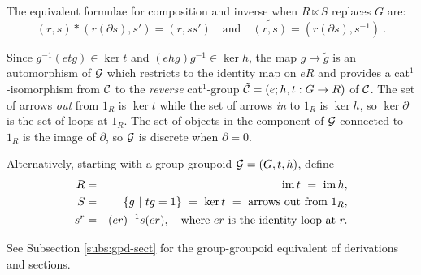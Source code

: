\medskip\noindent
The equivalent formulae for composition and inverse 
when  $R \ltimes S$  replaces $G$ are:
$$
(r, s) * (r (\partial s), s') = (r, ss')
\quad \mbox{and} \quad  
\widetilde{(r,s)} = (r(\partial s), s^{-1})~.
$$

Since  $g^{-1}(etg) \in \ker t$  and  $(ehg)g^{-1} \in \ker h$,
the map  $g \mapsto \tilde{g}$  is an automorphism of  $\mathcal{G}$
which restricts to the identity map on  $eR$  and
provides a cat$^1$-isomorphism from  $\mathcal{C}$  to the \emph{reverse}
cat$^1$-group $\tilde{\mathcal{C}} = (e;h,t : G \to R)$ of $\mathcal{C}$.
The set of arrows \emph{out} from  $1_R$  is  $\ker t$
while the set of arrows \emph{in} to  $1_R$  is  $\ker h$,
so  $\ker \partial$  is the set of loops at  $1_R$.
The set of objects in the component of  $\mathcal{G}$
connected to  $1_R$  is the image of  $\partial$,
so  $\mathcal{G}$  is discrete when  $\partial = 0$.

Alternatively, starting with a group groupoid $\mathcal{G} = (G,t,h)$, define
\begin{eqnarray*}
  R & = & \mathrm{im}\, t ~=~ \mathrm{im}\, h, \\
  S & = & \{g ~|~ tg = 1\} ~=~ \ker t ~=~ \mbox{arrows out from}~ 1_R, \\
s^r & = & (er)^{-1}s(er), 
\quad\text{where}~ er ~\text{is the identity loop at}~ r.
\end{eqnarray*}

\bigskip\noindent
See Subsection \ref{subs:gpd-sect} for the group-groupoid 
equivalent of derivations and sections.


